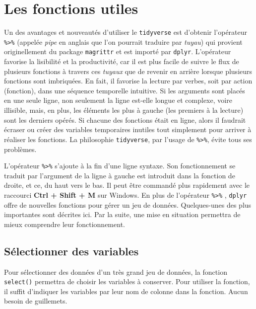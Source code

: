 \documentclass[
]{book}
\begin{document}
\hypertarget{les-fonctions-utiles}{%
\section{Les fonctions utiles}\label{les-fonctions-utiles}}

Un des avantages et nouveautés d'utiliser le \texttt{tidyverse} est d'obtenir l'opérateur \texttt{\%\textgreater{}\%} (appelée \emph{pipe} en anglais que l'on pourrait traduire par \emph{tuyau}) qui provient originellement du package \texttt{magrittr} \autocite{magri} et est importé par \texttt{dplyr}. L'opérateur favorise la lisibilité et la productivité, car il est plus facile de suivre le flux de plusieurs fonctions à travers ces \emph{tuyaux} que de revenir en arrière lorsque plusieurs fonctions sont imbriquées. En fait, il favorise la lecture par verbes, soit par action (fonction), dans une séquence temporelle intuitive. Si les arguments sont placés en une seule ligne, non seulement la ligne est-elle longue et complexe, voire illisible, mais, en plus, les éléments les plus à gauche (les premiers à la lecture) sont les derniers opérés. Si chacune des fonctions était en ligne, alors il faudrait écraser ou créer des variables temporaires inutiles tout simplement pour arriver à réaliser les fonctions. La philosophie \texttt{tidyverse}, par l'usage de \texttt{\%\textgreater{}\%}, évite tous ses problèmes.

L'opérateur \texttt{\%\textgreater{}\%} s'ajoute à la fin d'une ligne syntaxe. Son fonctionnement se traduit par l'argument de la ligne à gauche est introduit dans la fonction de droite, et ce, du haut vers le bas. Il peut être commandé plus rapidement avec le raccourci \textbf{Ctrl + Shift + M} sur Windows. En plus de l'opérateur \texttt{\%\textgreater{}\%} , \texttt{dplyr} offre de nouvelles fonctions pour gérer un jeu de données. Quelques-unes des plus importantes sont décrites ici. Par la suite, une mise en situation permettra de mieux comprendre leur fonctionnement.

\hypertarget{suxe9lectionner-des-variables}{%
\subsection{Sélectionner des variables}\label{suxe9lectionner-des-variables}}

Pour sélectionner des données d'un très grand jeu de données, la fonction \texttt{select()} permettra de choisir les variables à conserver. Pour utiliser la fonction, il suffit d'indiquer les variables par leur nom de colonne dans la fonction. Aucun besoin de guillemets.
\end{document}
